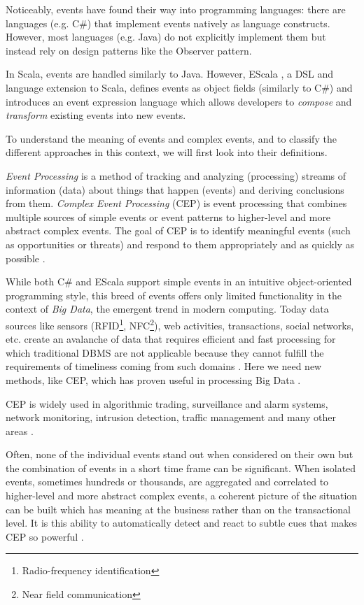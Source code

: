 \documentclass[book,type=bsc,colorback,accentcolor=tud8b,12pt,twoside]{tudthesis}
\begin{document}
Noticeably, events have found their way into programming languages: there are languages (e.g. C\#) that implement events natively as language constructs.  However, most languages (e.g. Java) do not explicitly implement them but instead rely on design patterns like the Observer pattern.  

In Scala, events are handled similarly to Java.  However, EScala \cite{Gasiunas:2011gg}, a DSL and language extension to Scala, defines events as object fields (similarly to C\#) and introduces an event expression language which allows developers to \emph{compose} and \emph{transform} existing events into new events.  

To understand the meaning of events and complex events, and to classify the different approaches in this context, we will first look into their definitions.  

\emph{Event Processing} is a method of tracking and analyzing (processing) streams of information (data) about things that happen (events) and deriving conclusions from them.  \emph{Complex Event Processing} (CEP) is event processing that combines multiple sources of simple events or event patterns to higher-level and more abstract complex events.  The goal of CEP is to identify meaningful events (such as opportunities or threats) and respond to them appropriately and as quickly as possible \cite{ChristianJaniesch:2011vz}.  

While both C\# and EScala support simple events in an intuitive object-oriented programming style, this breed of events offers only limited functionality in the context of \emph{Big Data}, the emergent trend in modern computing.  Today data sources like sensors (RFID\footnote{Radio-frequency identification}, NFC\footnote{Near field communication}), web activities, transactions, social networks, etc. create an avalanche of data that requires efficient and fast processing for which traditional DBMS are not applicable because they cannot fulfill the requirements of timeliness coming from such domains \cite{Cugola:2012hh}.  Here we need new methods, like CEP, which has proven useful in processing Big Data \cite{Peer:ve}.  

CEP is widely used in algorithmic trading, surveillance and alarm systems, network monitoring, intrusion detection, traffic management and many other areas \cite{Cugola:2012hh, Eugster:2009ds}.  

Often, none of the individual events stand out when considered on their own but the combination of events in a short time frame can be significant.  When isolated events, sometimes hundreds or thousands, are aggregated and correlated to higher-level and more abstract complex events, a coherent picture of the situation can be built which has meaning at the business rather than on the transactional level.  It is this ability to automatically detect and react to subtle cues that makes CEP so powerful \cite{Wormus:2008va}.  
\end{document}
